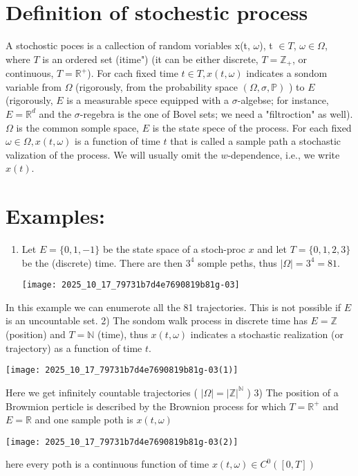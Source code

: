 \section*{Definition of stochestic process}
A stochostic poces is a callection of random voriables {x(t, $\omega$), t $\in T$, $\omega \in \Omega$}, where $T$ is an ordered set (itime") (it can be either discrete, $T=\mathbb{Z}_{+}$, or continuous, $T=\mathbb{R}^{+}$). For cach fixed time $t \in T, x(t, \omega)$ indicates a sondom variable from $\Omega$ (rigorously, from the probability space $(\Omega, \sigma, \mathbb{P})$ ) to $E$ (rigorously, $E$ is a measurable spece equipped with a $\sigma$-algebse; for instance, $E=\mathbb{R}^{d}$ and the $\sigma$-regebra is the one of Bovel sets; we need a "filtroction" as well).
$\Omega$ is the common somple space, $E$ is the state spece of the process.
For each fixed $\omega \in \Omega, x(t, \omega)$ is a function of time $t$ that is called a sample path a stochastic valization of the process. We will usually omit the $w$-dependence, i.e., we write $x(t)$.

\section*{Examples:}
\begin{enumerate}
  \item Let $E=\{0,1,-1\}$ be the state space of a stoch-proc $x$ and let $T=\{0,1,2,3\}$ be the (discrete) time. There are then $3^{4}$ somple peths, thus $|
\Omega|=3^{4}=81$.
\begin{center}
\texttt{[image: 2025\_10\_17\_79731b7d4e7690819b81g-03]}
\end{center}
\end{enumerate}

In this example we can enumerote all the 81 trajectories. This is not possible if $E$ is an uncountable set.
2) The sondom walk process in discrete time has
$E=\mathbb{Z}$ (position) and $T=\mathbb{N}$ (time), thus $x(t, \omega)$ indicates a stochastic realization (or trajectory) as a function of time $t$.
\begin{center}
\texttt{[image: 2025\_10\_17\_79731b7d4e7690819b81g-03(1)]}
\end{center}

Here we get infinitely countable trajectories ( $|
\Omega|=|
\mathbb{Z}|^{\mathbb{N}}$ )
3) The position of a Browmion perticle is described by the Brownion process for which $T=\mathbb{R}^{+}$ and $E=\mathbb{R}$ and one sample poth is $x(t, \omega)$
\begin{center}
\texttt{[image: 2025\_10\_17\_79731b7d4e7690819b81g-03(2)]}
\end{center}
here every poth is a continuous function of time $x(t, \omega) \in C^{0}([0, T])$

